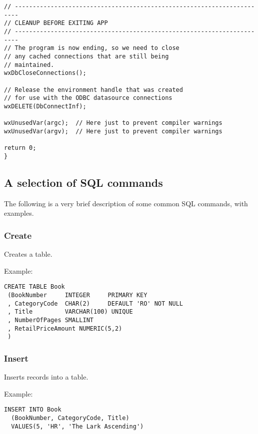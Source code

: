 \begin{verbatim}
// -----------------------------------------------------------------------
// CLEANUP BEFORE EXITING APP
// -----------------------------------------------------------------------
// The program is now ending, so we need to close
// any cached connections that are still being 
// maintained.
wxDbCloseConnections();

// Release the environment handle that was created
// for use with the ODBC datasource connections
wxDELETE(DbConnectInf);

wxUnusedVar(argc);  // Here just to prevent compiler warnings
wxUnusedVar(argv);  // Here just to prevent compiler warnings

return 0;
}
\end{verbatim}

\subsection{A selection of SQL commands}\label{sqlcommands}

The following is a very brief description of some common SQL commands, with
examples.



\subsubsection{Create}\label{odbccreateexample}

Creates a table.

Example:

\begin{verbatim}
CREATE TABLE Book
 (BookNumber     INTEGER     PRIMARY KEY
 , CategoryCode  CHAR(2)     DEFAULT 'RO' NOT NULL
 , Title         VARCHAR(100) UNIQUE
 , NumberOfPages SMALLINT
 , RetailPriceAmount NUMERIC(5,2)
 )
\end{verbatim}

\subsubsection{Insert}\label{odbcinsertexample}

Inserts records into a table.

Example:

\begin{verbatim}
INSERT INTO Book
  (BookNumber, CategoryCode, Title)
  VALUES(5, 'HR', 'The Lark Ascending')
\end{verbatim}

